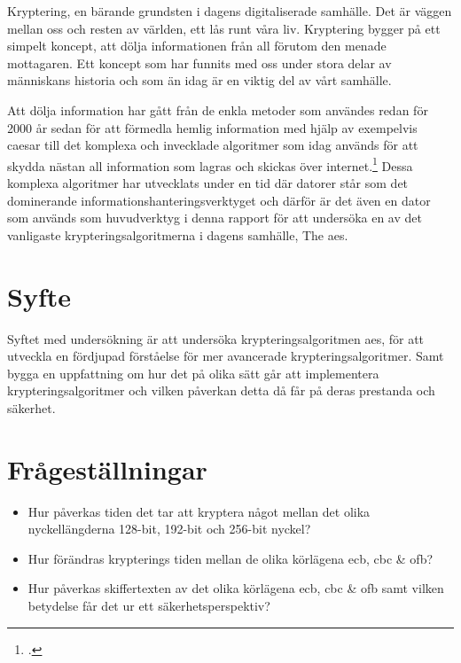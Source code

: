 Kryptering, en bärande grundsten i dagens digitaliserade samhälle. Det är väggen mellan oss och resten
av världen, ett lås runt våra liv. Kryptering bygger på ett simpelt koncept, att dölja informationen
från all förutom den menade mottagaren. Ett koncept som har funnits med oss under stora delar av
människans historia och som än idag är en viktig del av vårt samhälle.

Att dölja information har gått från de enkla metoder som användes redan för 2000 år sedan för att förmedla hemlig information med hjälp av
exempelvis \gls{caesar} till det komplexa och invecklade algoritmer som idag används för att skydda nästan all information som lagras och skickas
över internet.\footcite{luciano1987cryptology} Dessa komplexa algoritmer har utvecklats under en tid där datorer står som det dominerande informationshanteringsverktyget och
därför är det även en dator som används som huvudverktyg i denna rapport för att undersöka en av det vanligaste krypteringsalgoritmerna i dagens samhälle,
The \acrfull{aes}.

\section{Syfte} %
Syftet med undersökning är att undersöka krypteringsalgoritmen \acrshort{aes},
för att utveckla en fördjupad förståelse för mer avancerade krypteringsalgoritmer.
Samt bygga en uppfattning om hur det på olika sätt går att implementera krypteringsalgoritmer
och vilken påverkan detta då får på deras prestanda och säkerhet.

\section{Frågeställningar} %
\begin{itemize}
    \setlength{\itemindent}{-1em}
    \item Hur påverkas tiden det tar att kryptera något mellan det olika nyckellängderna 128-bit,
          192-bit och 256-bit nyckel?

    \item Hur förändras krypterings tiden mellan de olika körlägena \acrshort{ecb}, \acrshort{cbc} \& \acrshort{ofb}?

    \item Hur påverkas skiffertexten av det olika körlägena \acrshort{ecb}, \acrshort{cbc} \& \acrshort{ofb}
          samt vilken betydelse får det ur ett säkerhetsperspektiv?
\end{itemize}

